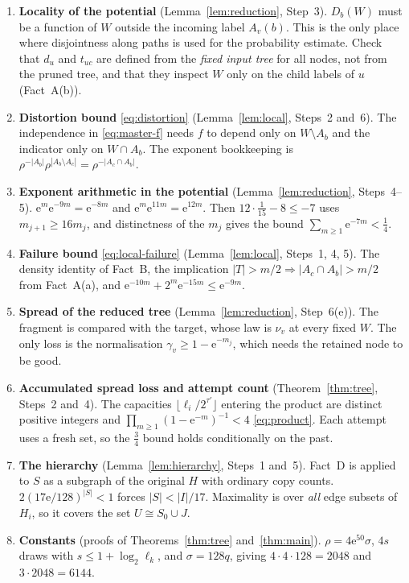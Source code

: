 \documentclass[11pt]{article}
\numberwithin{equation}{section}
\newcommand{\ee}{\mathrm e}
\begin{document}
\begin{enumerate}[leftmargin=2em,itemsep=4pt]
 \item \textbf{Locality of the potential} (Lemma~\ref{lem:reduction},
 Step~3). $D_b(W)$ must be a function of $W$ outside the incoming
 label $A_v(b)$. This is the only place where disjointness along paths
 is used for the probability estimate. Check that $d_u$ and $t_{uc}$
 are defined from the \emph{fixed input tree} for all nodes, not from
 the pruned tree, and that they inspect $W$ only on the child labels
 of $u$ (Fact~A(b)).
 \item \textbf{Distortion bound} \eqref{eq:distortion}
 (Lemma~\ref{lem:local}, Steps~2 and~6). The independence in
 \eqref{eq:master-f} needs $f$ to depend only on $W\setminus A_b$ and
 the indicator only on $W\cap A_b$. The exponent bookkeeping is
 $\rho^{-|A_b|}\rho^{|A_b\setminus A_c|}=\rho^{-|A_c\cap A_b|}$.
 \item \textbf{Exponent arithmetic in the potential}
 (Lemma~\ref{lem:reduction}, Steps~4--5).
 $\ee^{m}\ee^{-9m}=\ee^{-8m}$ and $\ee^{m}\ee^{11m}=\ee^{12m}$. Then
 $12\cdot\frac1{15}-8\le-7$ uses $m_{j+1}\ge16m_j$, and distinctness
 of the $m_j$ gives the bound $\sum_{m\ge1}\ee^{-7m}<\frac14$.
 \item \textbf{Failure bound} \eqref{eq:local-failure}
 (Lemma~\ref{lem:local}, Steps~1, 4, 5). The density identity of
 Fact~B, the implication
 $|T|>m/2\Rightarrow|A_c\cap A_b|>m/2$ from Fact~A(a), and
 $\ee^{-10m}+2^m\ee^{-15m}\le\ee^{-9m}$.
 \item \textbf{Spread of the reduced tree}
 (Lemma~\ref{lem:reduction}, Step~6(e)). The fragment is compared with
 the target, whose law is $\nu_v$ at every fixed $W$. The only loss is
 the normalisation $\gamma_v\ge1-\ee^{-m_j}$, which needs the retained
 node to be good.
 \item \textbf{Accumulated spread loss and attempt count}
 (Theorem~\ref{thm:tree}, Steps~2 and~4). The capacities
 $\lfloor\ell_i/2^{\tau'}\rfloor$ entering the product are distinct
 positive integers and $\prod_{m\ge1}(1-\ee^{-m})^{-1}<4$
 \eqref{eq:product}. Each attempt uses a fresh set, so the $\frac34$
 bound holds conditionally on the past.
 \item \textbf{The hierarchy} (Lemma~\ref{lem:hierarchy}, Steps~1
 and~5). Fact~D is applied to $S$ as a subgraph of the original $H$
 with ordinary copy counts. $2(17\ee/128)^{|S|}<1$ forces
 $|S|<|I|/17$. Maximality is over \emph{all} edge subsets of $H_i$, so
 it covers the set $U\cong S_0\cup J$.
 \item \textbf{Constants} (proofs of Theorems~\ref{thm:tree}
 and~\ref{thm:main}). $\rho=4\ee^{50}\sigma$, $4s$ draws with
 $s\le1+\log_2\ell_k$, and $\sigma=128q$, giving
 $4\cdot4\cdot128=2048$ and $3\cdot2048=6144$.
\end{enumerate}
\end{document}
